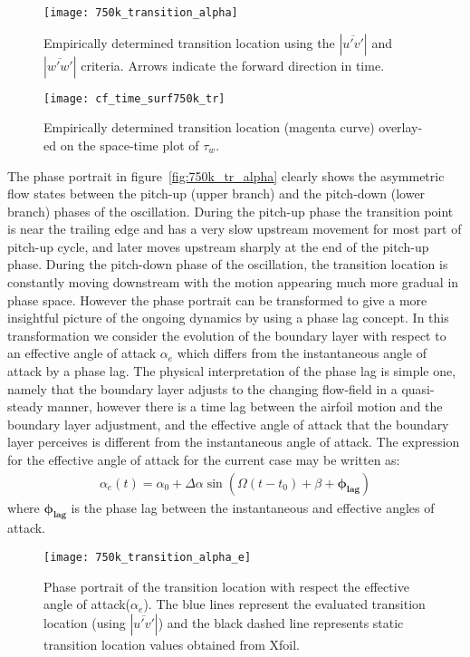 \begin{wrapfigure}[43]{r}{0.58\textwidth}
	\centering	
	\texttt{[image: 750k\_transition\_alpha]}
	\caption{Empirically determined transition location using the $|\overline{u'v'}|$ and $|\overline{w'w'}|$ criteria. Arrows indicate the forward direction in time.}
	\label{fig:750k_tr_alpha}
	\texttt{[image: cf\_time\_surf750k\_tr]}
	\caption{Empirically determined transition location (magenta curve) overlay-ed on the space-time plot of $\tau_{w}$.}
	\label{fig:750k_space-time_tr}	
\end{wrapfigure}

The phase portrait in figure~\ref{fig:750k_tr_alpha} clearly shows the asymmetric flow states between the pitch-up (upper branch) and the pitch-down (lower branch) phases of the oscillation. During the pitch-up phase the transition point is near the trailing edge and has a very slow upstream movement for most part of pitch-up cycle, and later moves upstream sharply at the end of the pitch-up phase. During the pitch-down phase of the oscillation, the transition location is constantly moving downstream with the motion appearing much more gradual in phase space. However the phase portrait can be transformed to give a more insightful picture of the ongoing dynamics by using a phase lag concept. In this transformation we consider the evolution of the boundary layer with respect to an effective angle of attack $\alpha_{e}$ which differs from the instantaneous angle of attack by a phase lag. The physical interpretation of the phase lag is simple one, namely that the boundary layer adjusts to the changing flow-field in a quasi-steady manner, however there is a time lag between the airfoil motion and the boundary layer adjustment, and the effective angle of attack that the boundary layer perceives is different from the instantaneous angle of attack. The expression for the effective angle of attack for the current case may be written as:
\begin{align}
	\alpha_{e}(t) = \alpha_{0} + \Delta\alpha\sin(\Omega (t-t_{0}) + \beta + \boldsymbol{\phi_{lag}}) %
	\label{eqn:unsteady_alpha_3}
\end{align}
where $\boldsymbol{\phi_{lag}}$ is the phase lag between the instantaneous and effective angles of attack.
\begin{wrapfigure}[22]{R}{0.58\textwidth}
	\centering
	\texttt{[image: 750k\_transition\_alpha\_e]}
	\caption{Phase portrait of the transition location with respect the effective angle of attack($\alpha_{e}$). The blue lines represent the evaluated transition location (using $|\overline{u'v'}|$) and the black dashed line represents static transition location values obtained from Xfoil.}
	\label{fig:750k_transition_phase_lag}
\end{wrapfigure}

